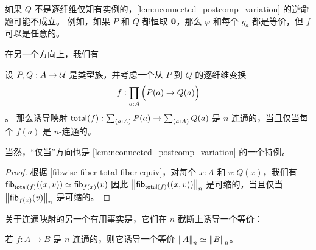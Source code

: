 如果 $Q$ 不是逐纤维仅知有实例的，\cref{lem:nconnected_postcomp_variation} 的逆命题可能不成立。
例如，如果 $P$ 和 $Q$ 都恒取 $\emptyt$，那么 $\varphi$ 和每个 $g_a$ 都是等价，但 $f$ 可以是任意的。

在另一个方向上，我们有

\begin{lem}\label{prop:nconn_fiber_to_total}
设 $P,Q:A\to\type$ 是类型族，并考虑一个从 $P$ 到 $Q$ 的逐纤维变换
\begin{equation*}
f:\prd{a:A} \Parens{P(a)\to Q(a)}
\end{equation*}
。
那么诱导映射 $\total f: \sm{a:A}P(a) \to \sm{a:A} Q(a)$ 是 $n$-连通的，当且仅当每个 $f(a)$ 是 $n$-连通的。
\end{lem}

当然，“仅当”方向也是 \cref{lem:nconnected_postcomp_variation} 的一个特例。

\begin{proof}
根据 \cref{fibwise-fiber-total-fiber-equiv}，对每个 $x:A$ 和 $v:Q(x)$，我们有
$\hfib{\total f}{\pairr{x,v}}\eqvsym\hfib{f(x)}v$
因此 $\trunc n{\hfib{\total f}{\pairr{x,v}}}$ 是可缩的，当且仅当
$\trunc n{\hfib{f(x)}v}$ 是可缩的。
\end{proof}

关于连通映射的另一个有用事实是，它们在 $n$-截断上诱导一个等价：

\begin{lem} \label{lem:connected-map-equiv-truncation}
若 $f : A \to B$ 是 $n$-连通的，则它诱导一个等价
$\eqv{\trunc{n}{A}}{\trunc{n}{B}}$。
\end{lem}

